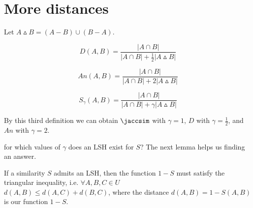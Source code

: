 
\section{More distances}
	Let $A \vartriangle B = (A-B) \cup (B-A)$.

	\begin{defn}
    	\begin{equation}
    	\displaystyle D(A, B) = \frac{|A\cap B|}{|A\cap B| + \frac{1}{2}|A\vartriangle B|}
    	\end{equation}
    \end{defn}
	
	\begin{defn}
        \begin{equation}
        \displaystyle An(A, B) = \frac{|A\cap B|}{|A\cap B| + 2|A\vartriangle B|}
        \end{equation}
    \end{defn}
	
	\begin{defn}
        \begin{equation}
        \displaystyle S_\gamma(A, B) = \frac{|A\cap B|}{|A\cap B| + \gamma|A\vartriangle B|}
        \end{equation}
    \end{defn}
	
	By this third definition we can obtain $\jaccsim$ with $\gamma=1$, $D$ with $\gamma=\frac{1}{2}$, and $An$ with $\gamma=2$.
	
	\begin{qst}
        for which values of $\gamma$ does an LSH exist for $S$? The next lemma helps us finding an answer.
    \end{qst}
	
	\begin{lem}[by Charikar]
        If a similarity $S$ admits an LSH, then the function $1-S$ must satisfy the triangular inequality, i.e. $\forall A,B,C \in U$ \\ $d(A,B) \leq d(A,C) + d(B,C)$, where the distance $d(A,B) = 1-S(A,B)$ is our function $1-S$.
    \end{lem}
	
